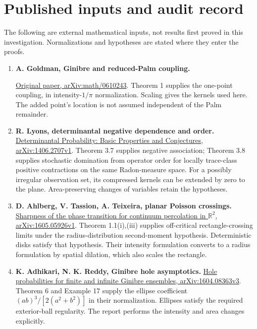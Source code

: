 \documentclass[11pt,a4paper]{article}
\theoremstyle{definition}
\theoremstyle{remark}
\numberwithin{equation}{section}
\begin{document}
\section{Published inputs and audit record}
\label{sec:inputs}

The following are external mathematical inputs, not results first proved
in this investigation. Normalizations and hypotheses are stated where
they enter the proofs.

\begin{enumerate}[leftmargin=*]
\item \textbf{A. Goldman, Ginibre and reduced-Palm coupling.}
\par
\href{https://arxiv.org/pdf/math/0610243}{Original paper, arXiv:math/0610243}.
Theorem 1 supplies the one-point coupling, in intensity-\(1/\pi\)
normalization. Scaling gives the kernels used here. The added point's
location is not assumed independent of the Palm remainder.

\item \textbf{R. Lyons, determinantal negative dependence and order.}
\href{https://arxiv.org/html/1406.2707v1}{Determinantal Probability:
Basic Properties and Conjectures, arXiv:1406.2707v1}.
Theorem 3.7 supplies negative association; Theorem 3.8 supplies stochastic
domination from operator order for locally trace-class positive
contractions on the same Radon-measure space. For a possibly irregular
observation set, its compressed kernels can be extended by zero to the
plane. Area-preserving changes of variables retain the hypotheses.

\item \textbf{D. Ahlberg, V. Tassion, A. Teixeira, planar Poisson crossings.}
\href{https://arxiv.org/html/1605.05926v1}{Sharpness of the phase
transition for continuum percolation in \(\mathbb R^2\),
arXiv:1605.05926v1}.
Theorem 1.1(i),(iii) supplies off-critical rectangle-crossing limits under
the radius-distribution second-moment hypothesis. Deterministic disks
satisfy that hypothesis. Their intensity formulation converts to a radius
formulation by spatial dilation, which also scales the rectangle.

\item \textbf{K. Adhikari, N. K. Reddy, Ginibre hole asymptotics.}
\href{https://arxiv.org/html/1604.08363v3}{Hole probabilities for finite
and infinite Ginibre ensembles, arXiv:1604.08363v3}.
Theorem 6 and Example 17 supply the ellipse coefficient
\((ab)^3/[2(a^2+b^2)]\) in their normalization. Ellipses satisfy the
required exterior-ball regularity. The report performs the intensity
and area changes explicitly.


\end{enumerate}
\end{document}
